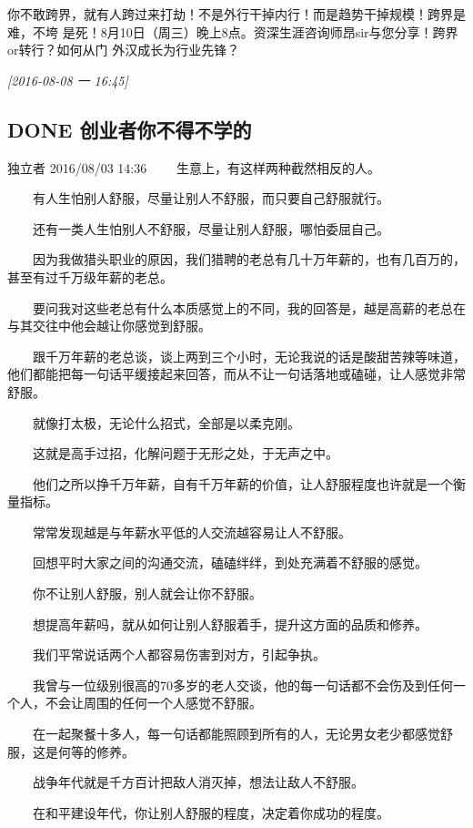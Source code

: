 \documentclass[11pt]{ctexart}
\begin{document}
你不敢跨界，就有人跨过来打劫！不是外行干掉内行！而是趋势干掉规模！跨界是难，不垮
是死！8月10日（周三）晚上8点。资深生涯咨询师昂sir与您分享！跨界or转行？如何从门
外汉成长为行业先锋？


\textit{[2016-08-08 一 16:45]}

\subsection{{\bfseries\sffamily DONE} 创业者你不得不学的}
\label{sec:orgheadline56}
独立者    2016/08/03 14:36
　　生意上，有这样两种截然相反的人。

　　有人生怕别人舒服，尽量让别人不舒服，而只要自己舒服就行。

　　还有一类人生怕别人不舒服，尽量让别人舒服，哪怕委屈自己。

　　因为我做猎头职业的原因，我们猎聘的老总有几十万年薪的，也有几百万的，甚至有过千万级年薪的老总。

　　要问我对这些老总有什么本质感觉上的不同，我的回答是，越是高薪的老总在与其交往中他会越让你感觉到舒服。

　　跟千万年薪的老总谈，谈上两到三个小时，无论我说的话是酸甜苦辣等味道，他们都能把每一句话平缓接起来回答，而从不让一句话落地或磕碰，让人感觉非常舒服。

　　就像打太极，无论什么招式，全部是以柔克刚。

　　这就是高手过招，化解问题于无形之处，于无声之中。

　　他们之所以挣千万年薪，自有千万年薪的价值，让人舒服程度也许就是一个衡量指标。

　　常常发现越是与年薪水平低的人交流越容易让人不舒服。

　　回想平时大家之间的沟通交流，磕磕绊绊，到处充满着不舒服的感觉。

　　你不让别人舒服，别人就会让你不舒服。

　　想提高年薪吗，就从如何让别人舒服着手，提升这方面的品质和修养。

　　我们平常说话两个人都容易伤害到对方，引起争执。

　　我曾与一位级别很高的70多岁的老人交谈，他的每一句话都不会伤及到任何一个人，不会让周围的任何一个人感觉不舒服。

　　在一起聚餐十多人，每一句话都能照顾到所有的人，无论男女老少都感觉舒服，这是何等的修养。

　　战争年代就是千方百计把敌人消灭掉，想法让敌人不舒服。

　　在和平建设年代，你让别人舒服的程度，决定着你成功的程度。
\end{document}
